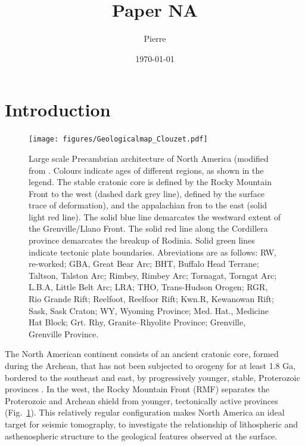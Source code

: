 \documentclass[12pt]{article}
\author{Pierre}
\title{Paper NA}
\date{\today}
\begin{document}
\maketitle

\section{Introduction}

\begin{figure}[p]
	\centering
	\centerline{\texttt{[image: figures/Geologicalmap\_Clouzet.pdf]}}



	\caption{\baselineskip 18pt
	Large scale Precambrian architecture of North America (modified from \cite{whitmeyer2007tectonic}. Colours indicate ages of different regions, as shown in the legend. The stable cratonic core is defined by the Rocky Mountain Front to the west (dashed dark grey line), defined by the surface trace of deformation), and the appalachian fron to the east (solid light red line). The solid blue line demarcates the westward extent of the Grenville/Llano Front. The solid red line along the Cordillera province demarcates the breakup of Rodinia. Solid green lines indicate tectonic plate boundaries. Abreviations are as follows: RW, re-worked; GBA, Great Bear Arc; BHT, Buffalo Head Terrane; Taltson, Talston Arc; Rimbey, Rimbey Arc; Tornagat, Torngat Arc; L.B.A, Little Belt Arc; LRA; THO, Trans-Hudson Orogen; RGR, Rio Grande Rift; Reelfoot, Reelfoor Rift; Kwn.R, Kewanowan Rift; Sask, Sask Craton; WY, Wyoming Province; Med. Hat., Medicine Hat Block; Grt. Rhy, Granite–Rhyolite Province; Grenville, Grenville Province.
	}

	\label{mapgeol}

\end{figure}

The North American continent consists of an ancient cratonic core, formed during the Archean, that has not been subjected to orogeny for at least 1.8 Ga, bordered to the southeast and east, by progressively younger, stable, Proterozoic provinces \citep{hoffman1988united}. In the west, the Rocky Mountain Front (RMF) separates the Proterozoic and Archean shield from younger, tectonically active provinces (Fig.~\ref{mapgeol}). This relatively regular configuration makes North America an ideal target for seismic tomography, to investigate the relationship of lithospheric and asthenospheric structure to the geological features observed at the surface. 
\end{document}
